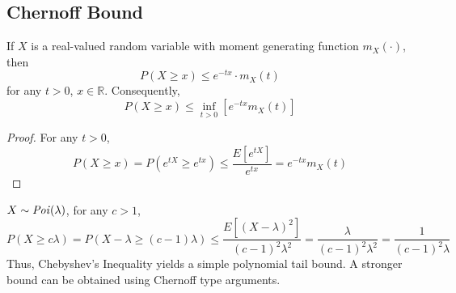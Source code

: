 \subsection{Chernoff Bound}
\begin{theorem}
If $X$ is a real-valued random variable with moment generating function
$m_X(\cdot)$, then
\[
	P(X \geq x) \leq e^{-tx} \cdot m_X(t)
\]
for any $t > 0$, $x \in \mathbb{R}$. Consequently,
\[
	P(X \geq x) \leq \inf_{t > 0} \left[ e^{-tx} m_X(t) \right]
\]
\end{theorem}
\begin{proof}
For any $t>0$,
\[
	  P(X \geq x)
	= P(e^{tX} \geq e^{tx}) 
	\leq \frac{E[e^{tX}]}{e^{tx}}
	= e^{-tx} m_X(t)
\]
\end{proof}
\begin{example}
$X \sim \text{\emph{Poi}}(\lambda)$, for any $c > 1$,
\[
	  P(X \geq c \lambda)
	= P(X - \lambda \geq (c - 1) \lambda)
	\leq \frac{E[(X - \lambda)^2]}{(c-1)^2 \lambda^2}
	= \frac{\lambda}{(c-1)^2 \lambda^2}
	= \frac{1}{(c-1)^2 \lambda}
\] 
Thus, Chebyshev's Inequality yields a simple polynomial tail bound. A stronger
bound can be obtained using Chernoff type arguments.
\end{example}
